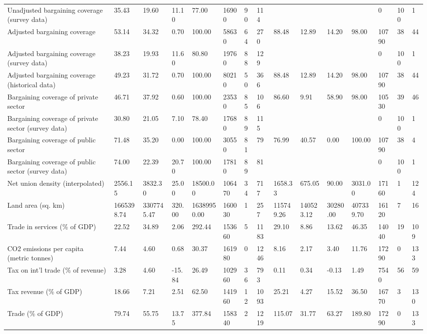\begin{longtable}{lllllllllllllll}
\addlinespace
Unadjusted bargaining coverage (survey data) & 35.43 & 19.60 & 11.10 & 77.00 & 16900 & 90 & 114 &  &  &  &  & 0 & 100 & 1\\
Adjusted bargaining coverage & 53.14 & 34.32 & 0.70 & 100.00 & 58630 & 64 & 270 & 88.48 & 12.89 & 14.20 & 98.00 & 10790 & 38 & 44\\
Adjusted bargaining coverage (survey data) & 38.23 & 19.93 & 11.60 & 80.80 & 19760 & 88 & 129 &  &  &  &  & 0 & 100 & 1\\
Adjusted bargaining coverage (historical data) & 49.23 & 31.72 & 0.70 & 100.00 & 80210 & 50 & 366 & 88.48 & 12.89 & 14.20 & 98.00 & 10790 & 38 & 44\\
Bargaining coverage of private sector & 46.71 & 37.92 & 0.60 & 100.00 & 23530 & 85 & 106 & 86.60 & 9.91 & 58.90 & 98.00 & 10530 & 39 & 46\\
\addlinespace
Bargaining coverage of private sector (survey data) & 30.80 & 21.05 & 7.10 & 78.40 & 17680 & 89 & 115 &  &  &  &  & 0 & 100 & 1\\
Bargaining coverage of public sector & 71.48 & 35.20 & 0.00 & 100.00 & 30550 & 81 & 79 & 76.99 & 40.57 & 0.00 & 100.00 & 10790 & 38 & 4\\
Bargaining coverage of public sector (survey data) & 74.00 & 22.39 & 20.70 & 100.00 & 17810 & 89 & 81 &  &  &  &  & 0 & 100 & 1\\
Net union density (interpolated) & 2556.15 & 3832.30 & 25.00 & 18500.00 & 106470 & 34 & 717 & 1658.33 & 675.05 & 90.00 & 3031.00 & 17160 & 1 & 124\\
Land area (sq. km) & 1665398.74 & 3307745.47 & 320.00 & 16389950.00 & 160030 & 1 & 257 & 115749.26 & 140523.12 & 30280.00 & 407339.70 & 16120 & 7 & 16\\
\addlinespace
Trade in services (\% of GDP) & 22.52 & 34.89 & 2.06 & 292.44 & 153660 & 5 & 1183 & 29.10 & 8.86 & 13.62 & 46.35 & 14040 & 19 & 109\\
CO2 emissions per capita (metric tonnes) & 7.44 & 4.60 & 0.68 & 30.37 & 161980 & 0 & 1246 & 8.16 & 2.17 & 3.40 & 11.76 & 17290 & 0 & 133\\
Tax on int'l trade (\% of revenue) & 3.28 & 4.60 & -15.84 & 26.49 & 102960 & 36 & 793 & 0.11 & 0.34 & -0.13 & 1.49 & 7540 & 56 & 59\\
Tax revenue (\% of GDP) & 18.66 & 7.21 & 2.51 & 62.50 & 141960 & 12 & 1093 & 25.21 & 4.27 & 15.52 & 36.50 & 16770 & 3 & 130\\
Trade (\% of GDP) & 79.74 & 55.75 & 13.75 & 377.84 & 158340 & 2 & 1219 & 115.07 & 31.77 & 63.27 & 189.80 & 17290 & 0 & 133\\

\end{longtable}
